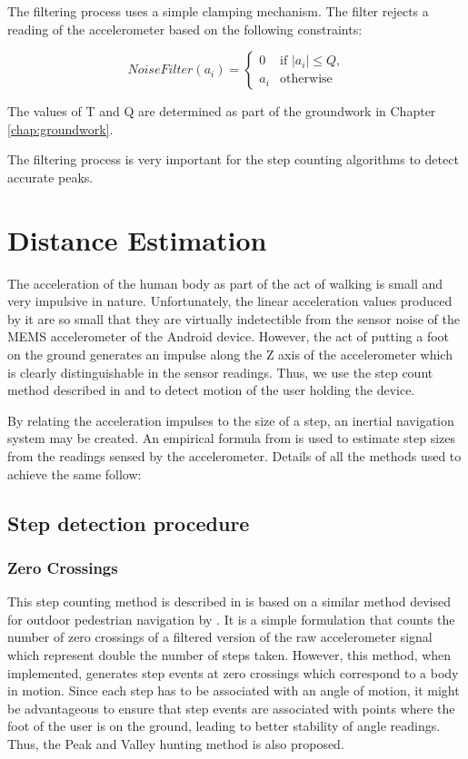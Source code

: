 The filtering process uses a simple clamping mechanism. The filter 
rejects a reading of the accelerometer based on the following constraints:

\begin{equation}
NoiseFilter(a_i) =  \begin{cases} 0 & \text{if $|a_i| \le Q$,} \\
                                a_i & \text{otherwise}
                    \end{cases}
\end{equation}

The values of T and Q are determined as part of the groundwork in Chapter 
\ref{chap:groundwork}.

The filtering process is very important for the step counting algorithms
to detect accurate peaks.

\section{Distance Estimation}

The acceleration of the human body as part of the act of walking is small and 
very impulsive in nature. Unfortunately, the linear acceleration values
produced by it are so small that they are virtually indetectible from the 
sensor noise of the MEMS accelerometer of the Android device. However, the 
act of putting a foot on the ground generates an impulse along the Z 
axis of the accelerometer which is clearly distinguishable in the sensor 
readings. Thus, we use the step count method described in
\cite{Wang} and \cite{Ladetto} to detect motion of the user holding the device.

By relating the acceleration impulses to the size of a step, 
an inertial navigation system may be created. An empirical formula 
from \cite{ADXL202} is used to estimate step sizes from the readings sensed by
the accelerometer. Details of all the methods used to achieve the same 
follow:

\subsection{Step detection procedure\label{sec:step_detection}}

\subsubsection{Zero Crossings}

This step counting method is described in \cite{Wang} is based on a similar 
method devised for outdoor pedestrian navigation by \cite{Ladetto}. It is a
simple formulation that counts the number of zero crossings of a 
filtered version of the raw accelerometer signal which represent double the 
number of steps taken. However, this method, when implemented, generates 
step events at zero crossings which correspond to a body in motion.
Since each step has to be associated with an angle of motion, it might be 
advantageous to ensure that step events are associated with points where 
the foot of the user is on the ground, leading to better stability of angle 
readings. Thus, the Peak and Valley hunting method is also proposed. 


